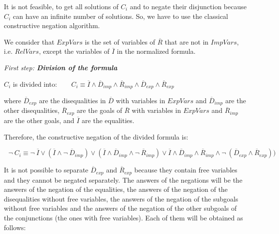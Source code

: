 \documentclass{llncs}
\begin{document}
It is not feasible, to get all solutions of $C_i$ and to negate their
disjunction because $C_i$ can have an infinite number of solutions. So,
we have to use the classical constructive negation algorithm.

We consider that $ExpVars$ is the set of variables of $\overline{R}$
that are not in $ImpVars$, i.e. $RelVars$, except the variables of
$\overline{I}$ in the normalized formula.
\medskip

\noindent
{\em First step: {\bf Division of the formula}}

\noindent
$C_i$ is divided into: $~~~~~~~~C_i \equiv \overline{I} \wedge
        \overline{D}_{imp} \wedge \overline{R}_{imp} \wedge
        \overline{D}_{exp} \wedge \overline{R}_{exp} $

\noindent
where $\overline{D}_{exp}$ are the disequalities in $\overline{D}$
with variables in $ExpVars$ and $\overline{D}_{imp}$ are the other
disequalities, $\overline{R}_{exp}$ are the goals of $\overline{R}$
with variables in $ExpVars$ and $\overline{R}_{imp}$ are the other
goals, and $\overline{I}$ are the equalities.

Therefore, the constructive negation of the divided formula is:


\noindent
$ ~~~\neg~C_i \equiv \neg~\overline{I} \vee (\overline{I} \wedge
\neg~\overline{D}_{imp}) \vee (\overline{I} \wedge \overline{D}_{imp}
\wedge \neg~\overline{R}_{imp}) \vee \overline{I} \wedge
\overline{D}_{imp} \wedge \overline{R}_{imp} \wedge
\neg~(\overline{D}_{exp} \wedge \overline{R}_{exp})) $
\noindent

It is not possible to separate $\overline{D}_{exp}$ and
$\overline{R}_{exp}$ because they contain free variables and
they cannot be negated separately. The answers of the negations
will be the answers of the negation of the equalities, the answers of
the negation of the disequalities without free variables, the answers
of the negation of the subgoals without free variables and the answers
of the negation of the other subgoals of the conjunctions (the ones
with free variables). Each of them will be obtained as follows:
\medskip
\end{document}
